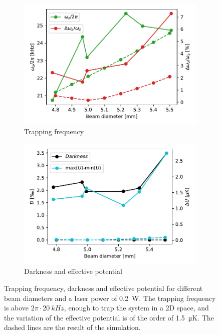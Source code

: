 \begin{figure}
    \begin{subfigure}{0.5\textwidth}
        \includegraphics[width=\textwidth]{chapters/chapter_3/figures/trapp_freq_diam+sim05W.pdf}
        \caption{Trapping frequency}
    \end{subfigure}
    \begin{subfigure}{0.5\textwidth}
        \includegraphics[width=\textwidth]{chapters/chapter_3/figures/darkenss_diam+sim05W.pdf}
        \caption{Darkness and effective potential}
    \end{subfigure}
    \caption{Trapping frequency, darkness and effective potential for different beam diameters and a laser power of \SI{0.2}{W}. The trapping frequency is above $2\pi\cdot\SI{20}{kHz}$, enough to trap the system in a 2D space, and the variation of the effective potential is of the order of \SI{1.5}{\micro K}. The dashed lines are the result of the simulation.}
    \label{fig:trap_05W}
\end{figure}

